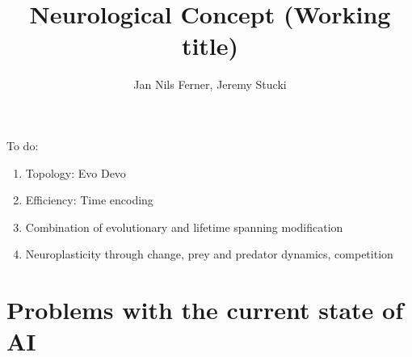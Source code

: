 \documentclass[a4paper]{article}
\title{Neurological Concept (Working title)}
\author{Jan Nils Ferner, Jeremy Stucki}
\begin{document}
\maketitle
\thispagestyle{empty}

\clearpage

\twocolumn

\begin{abstract}
	
\end{abstract}

\clearpage

\onecolumn
\tableofcontents
\twocolumn

\clearpage

To do:
\begin{enumerate}
	\item Topology: Evo Devo
	\item Efficiency: Time encoding
	\item Combination of evolutionary and lifetime spanning modification
	\item Neuroplasticity through change, prey and predator dynamics, competition
\end{enumerate}

\section{Problems with the current state of AI}
	

\clearpage

\nocite{*}


\end{document}
